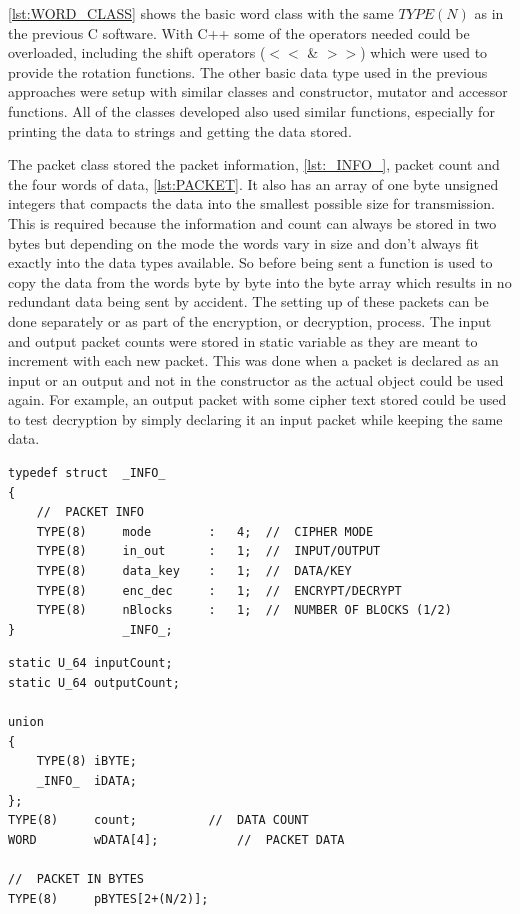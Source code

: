 \documentclass[12pt,twoside,a4paper]{report}
\begin{document}
	\autoref{lst:WORD_CLASS} shows the basic word class with the same $TYPE(N)$ as in the previous C software. With C++ some of the operators needed could be overloaded, including the shift operators ($<<$ \& $>>$) which were used to provide the rotation functions. The other basic data type used in the previous approaches were setup with similar classes and constructor, mutator and accessor functions. All of the classes developed also used similar functions, especially for printing the data to strings and getting the data stored.
    
   	The packet class stored the packet information, \autoref{lst:_INFO_}, packet count and the four words of data, \autoref{lst:PACKET}. It also has an array of one byte unsigned integers that compacts the data into the smallest possible size for transmission. This is required because the information and count can always be stored in two bytes but depending on the mode the words vary in size and don't always fit exactly into the data types available. So before being sent a function is used to copy the data from the words byte by byte into the byte array which results in no redundant data being sent by accident. The setting up of these packets can be done separately or as part of the encryption, or decryption, process. The input and output packet counts were stored in static variable as they are meant to increment with each new packet. This was done when a packet is declared as an input or an output and not in the constructor as the actual object could be used again. For example, an output packet with some cipher text stored could be used to test decryption by simply declaring it an input packet while keeping the same data.

	\begin{minipage}{\linewidth}
	\begin{lstlisting}[label={lst:_INFO_},caption={Declaration of Packet information},style=CStyle]
typedef struct	_INFO_
{
	//	PACKET INFO
	TYPE(8)		mode		:	4;	//	CIPHER MODE
	TYPE(8)		in_out		:	1;	//	INPUT/OUTPUT
	TYPE(8)		data_key	:	1;	//	DATA/KEY
	TYPE(8)		enc_dec		:	1;	//	ENCRYPT/DECRYPT
	TYPE(8)		nBlocks		:	1;	//	NUMBER OF BLOCKS (1/2)
}				_INFO_;
	\end{lstlisting}
	\end{minipage}

	\begin{minipage}{\linewidth}
	\begin{lstlisting}[label={lst:PACKET},caption={Data stored in Packet class},style=CStyle]	
static U_64	inputCount;
static U_64	outputCount;

union
{
	TYPE(8)	iBYTE;
	_INFO_	iDATA;
};
TYPE(8)		count;			//	DATA COUNT
WORD		wDATA[4];			//	PACKET DATA

//	PACKET IN BYTES	
TYPE(8)		pBYTES[2+(N/2)];
	\end{lstlisting}
	\end{minipage}
   	
\end{document}

